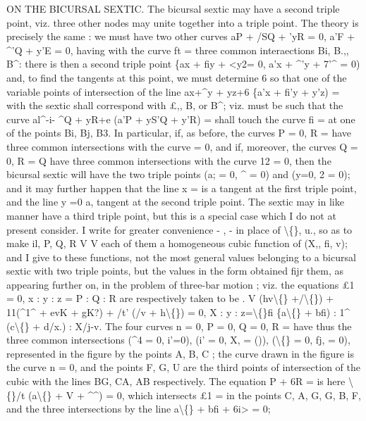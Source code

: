 \documentclass[11pt,a4paper]{book}
\begin{document}
ON THE BICURSAL
SEXTIC.
The
bicursal
sextic may
have
a
second
triple
point,
viz.
three
other
nodes may
unite
together
into
a
triple
point.
The
theory
is
precisely
the
same
: we
must
have
two
other
curves aP + /SQ + 'yR = 0,
a'F + \textasciicircum{}'Q + y'E = 0,
having
with
the
curve
ft =
three common interaections Bi,
B.,, B\textasciicircum{}:
there
is then a second
triple point
\{ax + fiy + <y2= 0,
a'x + \textasciicircum{}'y + 7'\textasciicircum{} = 0)
and,
to
find
the
tangents
at
this
point,
we
must
determine
6
so
that
one
of
the
variable points of intersection of the
line
ax+\textasciicircum{}y + yz+6 \{a'x + fi'y + y'z) =
with
the
sextic
shall correspond with
\pounds{},, B\guillemotleft{}, or B\textasciicircum{};
viz.
must be such
that the curve
al\textasciicircum{}-i- \textasciicircum{}Q + yR+e (a'P + yS'Q + y'R) =
shall
touch
the curve
fi =
at one
of the
points
Bi,
Bj,
B3.
In
particular,
if,
as
before,
the
curves P = 0, R =
have
three common
intersections
with
the
curve
= 0,
and
if,
moreover,
the
curves
Q = 0, R = Q
have
three common
intersections
with
the
curve
12 = 0,
then
the
bicursal
sextic
will
have
the
two
triple
points
(a; = 0,
\textasciicircum{} = 0)
and (y=0, 2 = 0);
and
it may further happen that
the
line
x =
is
a
tangent
at
the
first
triple
point, and
the
line y =0
a,
tangent
at
the
second
triple
point.
The
sextic may
in
like
manner have a third
triple
point, but
this
is a
special case which
I do not at present
consider.
I
write
for
greater
convenience
-
,
-
in
place
of
\textbackslash\{\},
u.,
so
as
to make
il, P,
Q, R
V
V
each
of them a homogeneous
cubic
function
of
(X,,
fi,
v);
and
I give
to these
functions,
not
the most
general
values
belonging
to
a
bicursal
sextic with two
triple
points, but
the
values
in
the
form
obtained
fijr them,
as
appearing
further
on,
in
the problem of
three-bar motion ;
viz. the
equations
\pounds{}1 = 0, x
: y
: z = P
: Q
: R are
respectively taken
to be
.
V (hv\textbackslash\{\} +/\textbackslash\{\}\guillemotright{}) + 11(\textasciicircum{}1\textasciicircum{} + evK + gK?) + /t' (/v + h\textbackslash\{\}) = 0,
X
: y
: z=\textbackslash\{\}fi \{a\textbackslash\{\} + bfi)
:
1\textasciicircum{} (c\textbackslash\{\} + d/x.)
:
X/j-v.
The four curves n = 0, P = 0, Q = 0, R =
have thus the
three common intersections
(\textasciicircum{}4 = 0, i'=0),
(i' = 0,
X, = ()),
(\textbackslash\{\} = 0,
fj, = 0),
represented
in
the
figure by the points
A,
B, C
;
the curve drawn
in the
figure
is the
curve n = 0, and
the
points
F,
G, U
are
the
third
points
of
intersection
of
the
cubic
with
the
lines BG, CA, AB respectively.
The
equation P + 6R =
is
here
\textbackslash\{\}/t (a\textbackslash\{\} + V + \textasciicircum{}\textasciicircum{}) = 0,
which
intersects
\pounds{}1 =
in
the
points
C, A,
G,
G, B, F,
and
the
three
intersections
by the
line
a\textbackslash\{\} + bfi + 6i> = 0;
\end{document}
